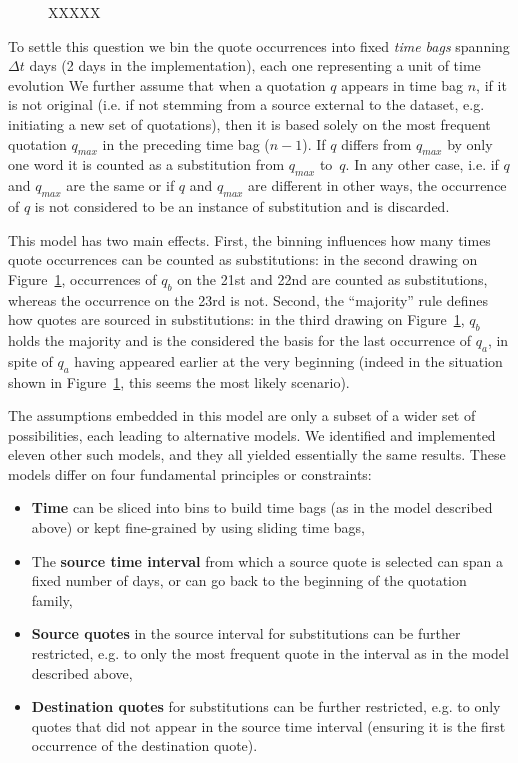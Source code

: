 \begin{figure}[h]
    \centering
    \def\svgwidth{\linewidth}
    \small
    
    \caption{XXXXX}
    \label{fig:substitution-temporal-binning}
\end{figure}

To settle this question we bin the quote occurrences into fixed \emph{time bags} spanning $\Delta t$ days (2 days in the implementation), each one representing a unit of time evolution
We further assume that when a quotation $q$ appears in time bag $n$, if it is not original (i.e. if not stemming from a source external to the dataset, e.g. initiating a new set of quotations), then it is based solely on the most frequent quotation $q_{max}$ in the preceding time bag ($n - 1$).
If $q$ differs from $q_{max}$ by only one word it is counted as a substitution from $q_{max}$ to~$q$.
In any other case, i.e. if $q$ and $q_{max}$ are the same or if $q$ and $q_{max}$ are different in other ways, the occurrence of $q$ is not considered to be an instance of substitution and is discarded.

This model has two main effects.
First, the binning influences how many times quote occurrences can be counted as substitutions: in the second drawing on Figure~\ref{fig:substitution-temporal-binning}, occurrences of $q_b$ on the 21st and 22nd are counted as substitutions, whereas the occurrence on the 23rd is not.
Second, the ``majority'' rule defines how quotes are sourced in substitutions: in the third drawing on Figure~\ref{fig:substitution-temporal-binning}, $q_b$ holds the majority and is the considered the basis for the last occurrence of $q_a$, in spite of $q_a$ having appeared earlier at the very beginning (indeed in the situation shown in Figure~\ref{fig:substitution-temporal-binning}, this seems the most likely scenario).

The assumptions embedded in this model are only a subset of a wider set of possibilities, each leading to alternative models.
We identified and implemented eleven other such models, and they all yielded essentially the same results.
These models differ on four fundamental principles or constraints:

\begin{itemize}
    \item \textbf{Time} can be sliced into bins to build time bags (as in the model described above) or kept fine-grained by using sliding time bags,
    \item The \textbf{source time interval} from which a source quote is selected can span a fixed number of days, or can go back to the beginning of the quotation family,
    \item \textbf{Source quotes} in the source interval for substitutions can be further restricted, e.g. to only the most frequent quote in the interval as in the model described above,
    \item \textbf{Destination quotes} for substitutions can be further restricted, e.g. to only quotes that did not appear in the source time interval (ensuring it is the first occurrence of the destination quote).
\end{itemize}

